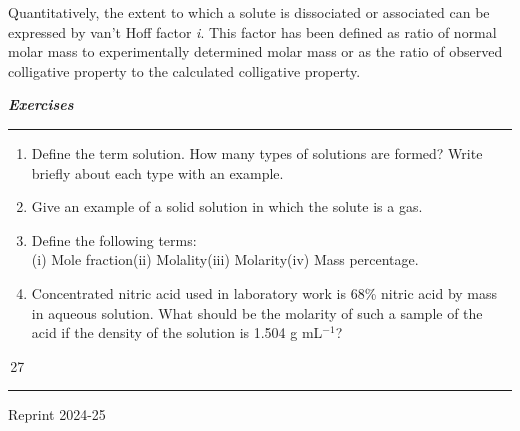 \documentclass[11pt,a4paper]{article}
\begin{document}
\begin{tcolorbox}
\hspace*{1.5em}Quantitatively, the extent to which a solute is dissociated or associated can be expressed by van't Hoff factor \textit{i}. This factor has been defined as ratio of normal molar mass to experimentally determined molar mass or as the ratio of observed colligative property to the calculated colligative property.
\end{tcolorbox}

\vspace{16pt}
\noindent\begin{minipage}[t]{0.955\textwidth}
\hfill{\color{red!80!black}\fontsize{22bp}{24bp}\selectfont\itshape\bfseries Exercises}\\[-6pt]
\mbox{}\hfill{\color{salmon}\rule{0.2\linewidth}{1.4pt}}

\begin{tcolorbox}[enhanced,frame hidden,colback=white,left=0pt,right=28pt,top=0pt,bottom=40pt,boxsep=0pt,arc=0pt,overlay={\fill[salmon] ([xshift=-10pt]frame.south east) rectangle (frame.north east);}]
\begin{enumerate}[label=\textbf{1.\arabic*},leftmargin=36pt,itemsep=3pt,topsep=0pt]
\item Define the term solution. How many types of solutions are formed? Write briefly about each type with an example.
\item Give an example of a solid solution in which the solute is a gas.
\item Define the following terms:\\
\hspace*{0.3em}(i) Mole fraction\hspace{2em}(ii) Molality\hspace{2em}(iii) Molarity\hspace{2em}(iv) Mass percentage.
\item Concentrated nitric acid used in laboratory work is 68\% nitric acid by mass in aqueous solution. What should be the molarity of such a sample of the acid if the density of the solution is 1.504 g mL$^{-1}$?
\end{enumerate}
\end{tcolorbox}
\end{minipage}

\vfill
\noindent\hfill\begin{minipage}{0.33\textwidth}
\colorbox{Goldenrod1}{\color{gray}\,27\,}\\[-6pt]
{\color{Goldenrod1}\rule{\linewidth}{1pt}}
\end{minipage}
\begin{center}
{\sffamily\small Reprint 2024-25}
\end{center}
\end{document}
